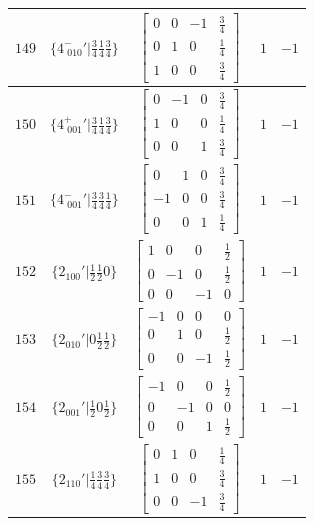 \documentclass[fleqn,8pt]{jsarticle}
\begin{document}
\begin{longtable}{ccccc}
$ 149 $ & $ \{4^{-}_{\,\,010}{}'|\frac{3}{4} \frac{1}{4} \frac{3}{4}\} $ & $ \begin{bmatrix} 0 & 0 & -1 & \frac{3}{4} \\ 0 & 1 & 0 & \frac{1}{4} \\ 1 & 0 & 0 & \frac{3}{4} \end{bmatrix} $ & $ 1 $ & $ -1 $ \\ \hline
$ 150 $ & $ \{4^{+}_{\,\,001}{}'|\frac{3}{4} \frac{1}{4} \frac{3}{4}\} $ & $ \begin{bmatrix} 0 & -1 & 0 & \frac{3}{4} \\ 1 & 0 & 0 & \frac{1}{4} \\ 0 & 0 & 1 & \frac{3}{4} \end{bmatrix} $ & $ 1 $ & $ -1 $ \\ \hline
$ 151 $ & $ \{4^{-}_{\,\,001}{}'|\frac{3}{4} \frac{3}{4} \frac{1}{4}\} $ & $ \begin{bmatrix} 0 & 1 & 0 & \frac{3}{4} \\ -1 & 0 & 0 & \frac{3}{4} \\ 0 & 0 & 1 & \frac{1}{4} \end{bmatrix} $ & $ 1 $ & $ -1 $ \\ \hline
$ 152 $ & $ \{2{}_{100}{}'|\frac{1}{2} \frac{1}{2} 0\} $ & $ \begin{bmatrix} 1 & 0 & 0 & \frac{1}{2} \\ 0 & -1 & 0 & \frac{1}{2} \\ 0 & 0 & -1 & 0 \end{bmatrix} $ & $ 1 $ & $ -1 $ \\ \hline
$ 153 $ & $ \{2{}_{010}{}'|0 \frac{1}{2} \frac{1}{2}\} $ & $ \begin{bmatrix} -1 & 0 & 0 & 0 \\ 0 & 1 & 0 & \frac{1}{2} \\ 0 & 0 & -1 & \frac{1}{2} \end{bmatrix} $ & $ 1 $ & $ -1 $ \\ \hline
$ 154 $ & $ \{2{}_{001}{}'|\frac{1}{2} 0 \frac{1}{2}\} $ & $ \begin{bmatrix} -1 & 0 & 0 & \frac{1}{2} \\ 0 & -1 & 0 & 0 \\ 0 & 0 & 1 & \frac{1}{2} \end{bmatrix} $ & $ 1 $ & $ -1 $ \\ \hline
$ 155 $ & $ \{2{}_{110}{}'|\frac{1}{4} \frac{3}{4} \frac{3}{4}\} $ & $ \begin{bmatrix} 0 & 1 & 0 & \frac{1}{4} \\ 1 & 0 & 0 & \frac{3}{4} \\ 0 & 0 & -1 & \frac{3}{4} \end{bmatrix} $ & $ 1 $ & $ -1 $ \\ \hline

\end{longtable}
\end{document}
